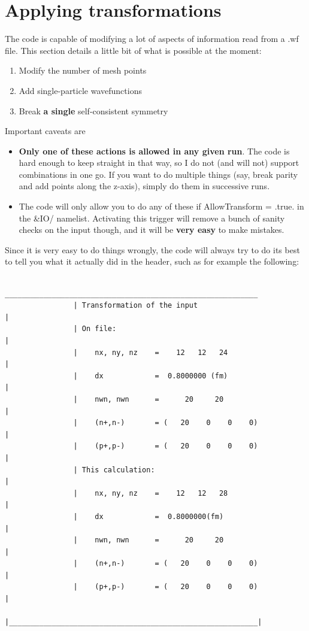 \documentclass[print,amsmath,amssymb,aps,prc,nofootinbib,notitlepage]{revtex4-1}
\begin{document}

\clearpage
\section{Applying transformations}

The code is capable of modifying a lot of aspects of information read from a .wf
file. This section details a little bit of what is possible at the moment:
%
\begin{enumerate}
\item Modify the number of mesh points
\item Add single-particle wavefunctions
\item Break \textbf{a single} self-consistent symmetry
\end{enumerate}
%
Important caveats are
\begin{itemize}
\item \textbf{Only one of these actions is allowed in any given run}. The code is hard enough
      to keep straight in that way, so I do not (and will not) support combinations in one go.
      If you want to do multiple things (say, break parity and add points along the z-axis), 
      simply do them in successive runs. 
\item The code will only allow you to do any of these if \textsf{AllowTransform = .true.} in the
      \textsf{\&IO/} namelist. Activating this trigger will remove a bunch of sanity checks on
      the input though, and it will be \textbf{very easy} to make mistakes.
\end{itemize}

 Since it is very easy to do things wrongly, the code will always try to do its 
 best to tell you what it actually did in the header, such as for example the 
 following:
 \begin{verbatim}
                ___________________________________________________________
                | Transformation of the input                              |
                | On file:                                                 |
                |    nx, ny, nz    =    12   12   24                       |
                |    dx            =  0.8000000 (fm)                       |
                |    nwn, nwn      =      20     20                        |
                |    (n+,n-)       = (   20    0    0    0)                |
                |    (p+,p-)       = (   20    0    0    0)                |
                | This calculation:                                        |
                |    nx, ny, nz    =    12   12   28                       |
                |    dx            =  0.8000000(fm)                        |
                |    nwn, nwn      =      20     20                        |
                |    (n+,n-)       = (   20    0    0    0)                |
                |    (p+,p-)       = (   20    0    0    0)                |
                |__________________________________________________________|

 \end{verbatim}
\end{document}
